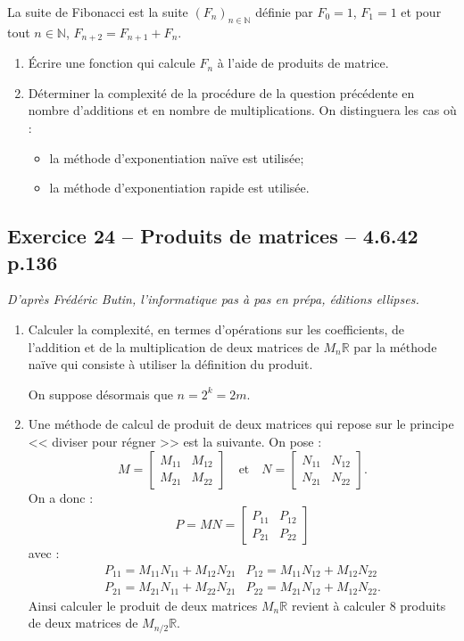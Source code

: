 \documentclass[10pt,fleqn]{article} %
\begin{document}
\begin{multicols}{2}
La suite de Fibonacci est la suite $\left( F_n \right)_{n \in \mathbb{N}}$ définie par $F_0=1$, $F_1=1$ et pour tout $n\in \mathbb{N}$, $F_{n+2}=F_{n+1}+F_{n}$.

\begin{enumerate}
\item Écrire une fonction qui calcule $F_n$ à l'aide de produits de matrice.
\item Déterminer la complexité de la procédure de la question précédente en nombre d'additions et en nombre de multiplications. On distinguera les cas où :
\begin{itemize}
\item la méthode d'exponentiation naïve est utilisée;
\item la méthode d'exponentiation rapide est utilisée.
\end{itemize}
\end{enumerate}


\subsection*{Exercice 24 -- Produits de matrices -- 4.6.42 p.136}
\begin{flushright}
\textit{D'après Frédéric Butin, l'informatique pas à pas en prépa, éditions ellipses.}
\end{flushright}
\begin{enumerate}
\item Calculer la complexité, en termes d'opérations sur les coefficients, de l'addition et de la multiplication de deux matrices de $M_n\mathbb{R}$ par la méthode naïve qui consiste à utiliser la définition du produit.

On suppose désormais que $n=2^k=2m$.
\item Une méthode de calcul de produit de deux matrices qui repose sur le principe << diviser pour régner >> est la suivante. On pose : 
$$
M=
\begin{bmatrix}
M_{11} & M_{12} \\
M_{21} & M_{22}
\end{bmatrix} 
\quad
\text{et}
\quad
N=
\begin{bmatrix}
N_{11} & N_{12} \\
N_{21} & N_{22}
\end{bmatrix} .
$$
On a donc :
$$
P=MN = 
\begin{bmatrix}
P_{11} & P_{12} \\
P_{21} & P_{22}
\end{bmatrix}
$$
avec :
$$
\begin{array}{ll}
P_{11} = M_{11}N_{11} + M_{12}N_{21} & 
P_{12} = M_{11}N_{12} + M_{12}N_{22} \\
P_{21} = M_{21}N_{11} + M_{22}N_{21} & 
P_{22} = M_{21}N_{12} + M_{12}N_{22}.
\end{array}
$$
Ainsi calculer le produit de deux matrices $M_n\mathbb{R}$ revient à calculer 8 produits de deux matrices de $M_{n/2}\mathbb{R}$.


\end{enumerate}
\end{multicols}
\end{document}
